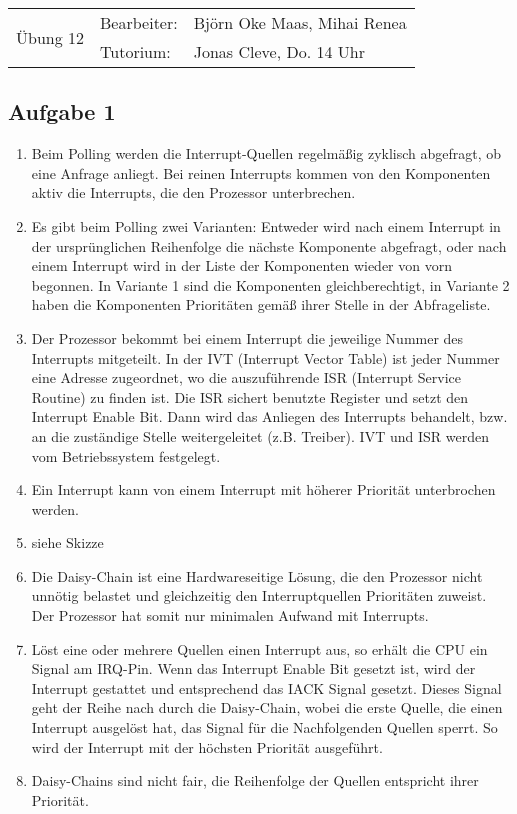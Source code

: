 \documentclass[paper=a4, english, ngerman]{scrartcl}
\begin{document}
	\begin{tabular}{p{8.5cm}ll}
		\multirow{2}{*}{\Huge{Übung 12} } & Bearbeiter: & Björn Oke Maas, Mihai Renea \\
		                                    & Tutorium:   & Jonas Cleve, Do. 14 Uhr     \\ \hline
	\end{tabular}
	
	\subsection*{Aufgabe 1}
\begin{enumerate}
	
	\item Beim Polling werden die Interrupt-Quellen regelmäßig zyklisch abgefragt, ob eine Anfrage anliegt. Bei reinen Interrupts kommen von den Komponenten aktiv die Interrupts, die den Prozessor unterbrechen.
	
	\item Es gibt beim Polling zwei Varianten: Entweder wird nach einem Interrupt in der ursprünglichen Reihenfolge die nächste Komponente abgefragt, oder nach einem Interrupt wird in der Liste der Komponenten wieder von vorn begonnen. In Variante 1 sind die Komponenten gleichberechtigt, in Variante 2 haben die Komponenten Prioritäten gemäß ihrer Stelle in der Abfrageliste.
	
	\item Der Prozessor bekommt bei einem Interrupt die jeweilige Nummer des Interrupts mitgeteilt. In der IVT (Interrupt Vector Table) ist jeder Nummer eine Adresse zugeordnet, wo die auszuführende ISR (Interrupt Service Routine) zu finden ist. Die ISR sichert benutzte Register und setzt den Interrupt Enable Bit. Dann wird das Anliegen des Interrupts behandelt, bzw. an die zuständige Stelle weitergeleitet (z.B. Treiber). IVT und ISR werden vom Betriebssystem festgelegt.
	
	\item Ein Interrupt kann von einem Interrupt mit höherer Priorität unterbrochen werden.
	
	\item siehe Skizze
	
	\item Die Daisy-Chain ist eine Hardwareseitige Lösung, die den Prozessor nicht unnötig belastet und gleichzeitig den Interruptquellen Prioritäten zuweist. Der Prozessor hat somit nur minimalen Aufwand mit Interrupts.
	
	\item Löst eine oder mehrere Quellen einen Interrupt aus, so erhält die CPU ein Signal am IRQ-Pin. Wenn das Interrupt Enable Bit gesetzt ist, wird der Interrupt gestattet und entsprechend das IACK Signal gesetzt. Dieses Signal geht der Reihe nach durch die Daisy-Chain, wobei die erste Quelle, die einen Interrupt ausgelöst hat, das Signal für die Nachfolgenden Quellen sperrt. So wird der Interrupt mit der höchsten Priorität ausgeführt.
	
	\item Daisy-Chains sind nicht fair, die Reihenfolge der Quellen entspricht ihrer Priorität.
\end{enumerate}
\end{document}
